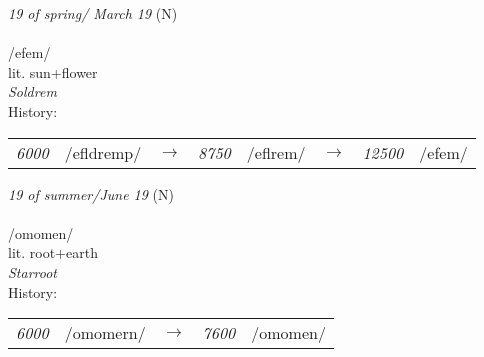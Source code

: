 \vspace{15pt}
\begin{nopagebreak}
 \textit{19 of spring/ March 19} (N)\\
\\
\noindent /{\textprimstress}efem/\\
\noindent lit. sun+flower\\
\noindent \textit{Soldrem}\\


\noindent History:

\vspace{-0pt}
\hspace{40pt}
\begin{tabular}{ccc}
\textit{6000} & /efldremp/&$\rightarrow$ & \textit{8750} & /eflrem/&$\rightarrow$ & \textit{12500} & /efem/& \\
\end{tabular}

\vspace{20pt}\hline

\end{nopagebreak}
\filbreak



\vspace{15pt}
\begin{nopagebreak}
 \textit{19 of summer/June 19} (N)\\
\\
\noindent /{}om{\textprimstress}omen/\\
\noindent lit. root+earth\\
\noindent \textit{Starroot}\\


\noindent History:

\vspace{-0pt}
\hspace{40pt}
\begin{tabular}{ccc}
\textit{6000} & /{}omomern/&$\rightarrow$ & \textit{7600} & /{}omomen/& \\
\end{tabular}

\vspace{20pt}\hline

\end{nopagebreak}
\filbreak




